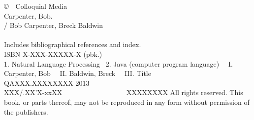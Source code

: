 \clearpage
\pagestyle{empty}
\vspace*{1.25in}
\noindent
{\footnotesize%
\copyright \ \ Colloquial Media
\hfill
\vfill
\vfill
{}
\\[6pt]
Carpenter, Bob.
\\
\hspace*{0.125in}{\it Text Analysis with LingPipe 4.0} / Bob
Carpenter, Breck Baldwin
\\
\hspace*{.5in}{p. cm.}
\\
\hspace*{0.125in}Includes bibliographical references and index.
\\
\hspace*{0.125in}ISBN X-XXX-XXXXX-X (pbk.)
\\[4pt]
1. Natural Language Processing  \ 2. Java (computer program language)
\ \ I. Carpenter, Bob \ \ II. Baldwin, Breck \ \ III. Title
\\[2pt]
\hspace*{0.125in}QAXXX.XXXXXXXX 2013
\\[2pt]
\hspace*{0.125in}XXX/.XX'X-xxXX      \ \ \ \ \ \ \ \ \ \ \ \ \ \ \ \ \  \ XXXXXXXX
\vfill
All rights reserved. This book, or parts thereof, may not
be reproduced in any form without permission of the publishers.
}

